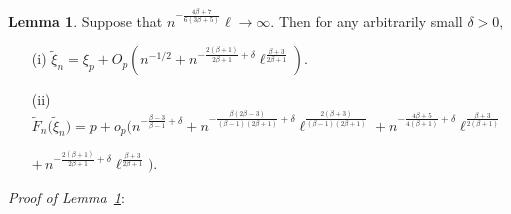 \documentclass[a4paper, 12pt]{article}
\theoremstyle{plain}
\theoremstyle{definition}
\newtheorem{lem}[thm]{Lemma}
\begin{document}
\begin{lem}
\label{lem:quan}
Suppose that $n^{-\frac{4\beta+7}{6(3\beta+5)}}\ell\rightarrow\infty$. Then
for any arbitrarily small $\delta>0$,
\begin{itemize}
\item[(i)] $\displaystyle
\tilde\xi_n=\xi_p+O_p\left(n^{-1/2}+n^{-\frac{2(\beta+1)}{2\beta+1}+\delta}
\ell^{\frac{\beta+3}{2\beta+1}}\right)$.
\item[(ii)] $\displaystyle
\tilde{F}_n\big(\tilde\xi_n\big)=p+o_p\Big(
n^{-\frac{\beta-3}{\beta-1}+\delta}
+n^{-\frac{\beta(2\beta-3)}{(\beta-1)(2\beta+1)}+\delta}
\ell^{\frac{2(\beta+3)}{(\beta-1)(2\beta+1)}}
+n^{-\frac{4\beta+5}{4(\beta+1)}+\delta}
\ell^{\frac{\beta+3}{2(\beta+1)}}$

\qquad\qquad\qquad\qquad$+\,n^{-\frac{2(\beta+1)}{2\beta+1}+\delta}
\ell^{\frac{\beta+3}{2\beta+1}}
\Big)$.
\end{itemize}
\end{lem}
{\it Proof of Lemma~\ref{lem:quan}\/}:
\end{document}
